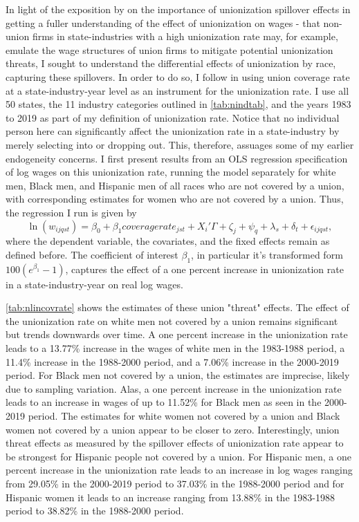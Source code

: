 \documentclass[11pt]{article}
\begin{document}
In light of the exposition by \citet{fll2021} on the importance of unionization spillover effects in getting a fuller understanding of the effect of unionization on wages - that non-union firms in state-industries with a high unionization rate may, for example, emulate the wage structures of union firms to mitigate potential unionization threats, I sought to understand the differential effects of unionization by race, capturing these spillovers. In order to do so, I follow \citet{fll2021} in using union coverage rate at a state-industry-year level as an instrument for the unionization rate. I use all 50 states, the 11 industry categories outlined in \autoref{tab:nindtab}, and the years 1983 to 2019 as part of my definition of unionization rate. Notice that no individual person here can significantly affect the unionization rate in a state-industry by merely selecting into or dropping out. This, therefore, assuages some of my earlier endogeneity concerns. I first present results from an OLS regression specification of log wages on this unionization rate, running the model separately for white men, Black men, and Hispanic men of all races who are not covered by a union, with corresponding estimates for women who are not covered by a union. Thus, the regression I run is given by
\begin{equation}
   \ln(w_{ijqst}) = \beta_0 + \beta_1 coveragerate_{jst} + X_i'\Gamma + \zeta_j + \psi_q + \lambda_s + \delta_t + \epsilon_{ijqst}, 
\end{equation}
where the dependent variable, the covariates, and the fixed effects remain as defined before. The coefficient of interest $\beta_1$, in particular it's transformed form $100(e^{\beta_1} - 1)$, captures the effect of a one percent increase in unionization rate in a state-industry-year on real log wages. 

\autoref{tab:nlincovrate} shows the estimates of these union "threat" effects. The effect of the unionization rate on white men not covered by a union remains significant but trends downwards over time. A one percent increase in the unionization rate leads to a 13.77\% increase in the wages of white men in the 1983-1988 period, a 11.4\% increase in the 1988-2000 period, and a 7.06\% increase in the 2000-2019 period. For Black men not covered by a union, the estimates are imprecise, likely due to sampling variation. Alas, a one percent increase in the unionization rate leads to an increase in wages of up to 11.52\% for Black men as seen in the 2000-2019 period. The estimates for white women not covered by a union and Black women not covered by a union appear to be closer to zero. Interestingly, union threat effects as measured by the spillover effects of unionization rate appear to be strongest for Hispanic people not covered by a union. For Hispanic men, a one percent increase in the unionization rate leads to an increase in log wages ranging from 29.05\% in the 2000-2019 period to 37.03\% in the 1988-2000 period and for Hispanic women it leads to an increase ranging from 13.88\% in the 1983-1988 period to 38.82\% in the 1988-2000 period.
\end{document}
